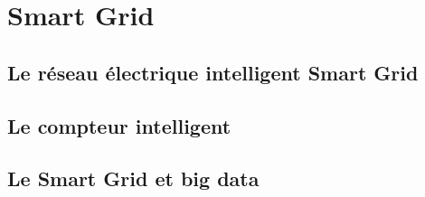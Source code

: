 \chapter{Smart Grid}
    
    \newpage
    \section{Le réseau électrique intelligent Smart Grid}
    	
    	\newpage
    	
    	\newpage
    	
    	\newpage
    	
    	
    	
    	\newpage
    	
    	\newpage
    	
    	\newpage
    	
    \section{Le compteur intelligent}
    	
    	\newpage
    	
    	\newpage
    	
    	\newpage
    	
	\section{Le Smart Grid et big data}
    	



